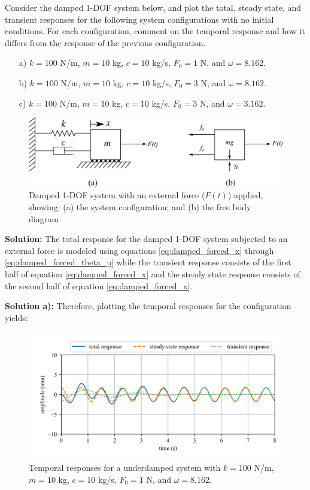 \documentclass[12pt,letter]{article}
\begin{document}
	\begin{example}
	\label{ex:homogeneous_and_particular_solutions_in_resonance}		
		Consider the damped 1-DOF system below, and plot the total, steady state, and transient responses for the following system configurations with no initial conditions. For each configuration, comment on the temporal response and how it differs from the response of the previous configuration.    
		
		\begin{itemize}
		\item[a)] $k=100$ N/m, $m=10$ kg,  $c=10$ kg/s, $F_0=1$ N, and $\omega = 8.162$.
		\item[b)] $k=100$ N/m, $m=10$ kg,  $c=10$ kg/s, $F_0=3$ N, and $\omega = 8.162$.
		\item[c)] $k=100$ N/m, $m=10$ kg,  $c=10$ kg/s, $F_0=3$ N, and $\omega = 3.162$.
		\end{itemize}
		
		\begin{figure}[H]
			\centering
			\includegraphics[]{../figures/1-DOF-spring_dashpot_mass_horizontal_forced_FBD.png}
			\caption{Damped 1-DOF system with an external force ($F(t)$) applied, showing: (a) the system configuration; and (b) the free body diagram}
		\end{figure}
		
		\noindent\textbf{Solution:} The total response for the damped 1-DOF system subjected to an external force is modeled using equations \ref{eq:damped_forced_x} through \ref{eq:damped_forced_theta_p} while the transient response consists of the first half of equation \ref{eq:damped_forced_x} and the steady state response consists of the second half of equation \ref{eq:damped_forced_x}.  
		
		
		\noindent\textbf{Solution a):} Therefore, plotting the temporal responses for the configuration yields:
		\begin{figure}[H]
			\centering
			\includegraphics[]{../figures/homogeneous_and_particular_solutions_in_resonance_a.png}
			\caption{Temporal responses for a underdamped system with $k=100$ N/m, $m=10$ kg,  $c=10$ kg/s, $F_0=1$ N, and $\omega = 8.162$.}
		\end{figure}			
 

\end{example}
\end{document}
